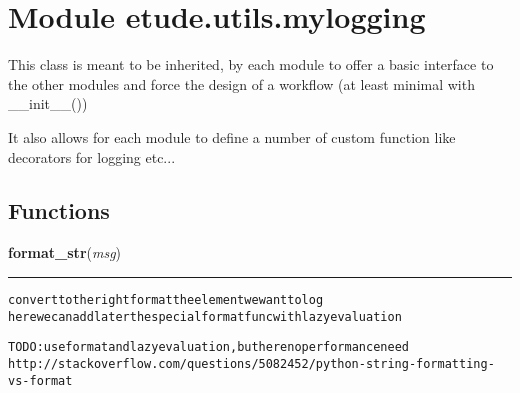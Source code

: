 %
%
%


\section{Module etude.utils.mylogging}

    \label{etude:utils:mylogging}
This class is meant to be inherited, by each module to offer a basic 
interface to the other modules and force the design of a workflow (at least
minimal with \_\_init\_\_())

It also allows for each module to define a number of custom function like 
decorators for logging etc...



  \subsection{Functions}

    \label{etude:utils:mylogging:format_str}

    \vspace{0.5ex}

\hspace{.8\funcindent}\begin{boxedminipage}{\funcwidth}

    \raggedright \textbf{format\_str}(\textit{msg})

    \vspace{-1.5ex}

    \rule{\textwidth}{0.5\fboxrule}
\setlength{\parskip}{2ex}
\begin{alltt}

    convert to the right format the element we want to log
    here we can add later the special format func with lazy evaluation

TODO : use format and lazy evaluation, but here no performance need
http://stackoverflow.com/questions/5082452/python-string-formatting-vs-format
\end{alltt}

\setlength{\parskip}{1ex}
    \end{boxedminipage}

